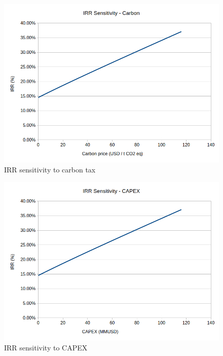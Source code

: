 \documentclass[a4paper, titlepage]{article}
\begin{document}
\begin{figure}
	\includegraphics[width=\textwidth]{img/fig_IRRsensitivity_carbon.png}
	\caption{IRR sensitivity to carbon tax}
	\label{img_IRRsens_carbon}
\end{figure}

\begin{figure}
	\includegraphics[width=\textwidth]{img/fig_IRRsensitivity_capex.png}
	\caption{IRR sensitivity to CAPEX}
	\label{img_IRRsens_capex}
\end{figure}
\end{document}
